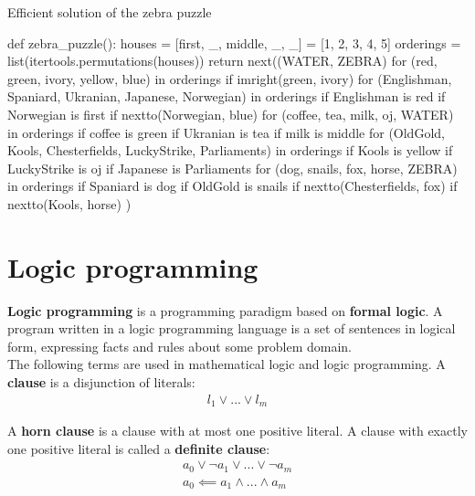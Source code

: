 \documentclass{report}
\begin{document}
\begin{algorithm}
\caption{Efficient solution of the zebra puzzle}
\label{python:zebrapuzzlefast}
\begin{python}
def zebra_puzzle():
    houses = [first, _, middle, _, _] = [1, 2, 3, 4, 5]
    orderings = list(itertools.permutations(houses))
    return next((WATER, ZEBRA)
                for (red, green, ivory, yellow, blue) in orderings
                if imright(green, ivory)
                for (Englishman, Spaniard, Ukranian,
                         Japanese, Norwegian) in orderings
                if Englishman is red
                if Norwegian is first
                if nextto(Norwegian, blue)
                for (coffee, tea, milk, oj, WATER) in orderings
                if coffee is green
                if Ukranian is tea
                if milk is middle
                for (OldGold, Kools, Chesterfields, LuckyStrike,
                        Parliaments) in orderings
                if Kools is yellow
                if LuckyStrike is oj
                if Japanese is Parliaments
                for (dog, snails, fox, horse, ZEBRA) in orderings
                if Spaniard is dog
                if OldGold is snails
                if nextto(Chesterfields, fox)
                if nextto(Kools, horse)
                )
\end{python}
\end{algorithm}

\section{Logic programming}
\label{chapter:logicprogramming}
{\bf Logic programming} is a programming paradigm based on {\bf formal logic}. A program written in a logic programming language is a set of sentences in logical form, expressing facts and rules about some problem domain.
\\
The following terms are used in mathematical logic and logic programming. A {\bf clause} is a disjunction of literals:
\begin{align*}
l_1 \vee ... \vee l_m
\end{align*}

A {\bf horn clause} is a clause with at most one positive literal. A clause with exactly one positive literal is called a {\bf definite clause}: 
\begin{align*}
a_0 \vee \neg a_1 \vee ... \vee \neg a_m \\
a_0 \impliedby a_1 \wedge ... \wedge a_m
\end{align*}
\end{document}
